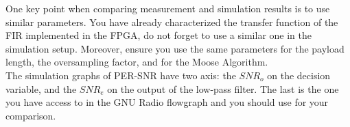 \begin{itemize}
\end{itemize}

One key point when comparing measurement and simulation results is to use similar parameters. You have already characterized the transfer function of the FIR implemented in the FPGA, do not forget to use a similar one in the simulation setup. Moreover, ensure you use the same parameters for the payload length, the oversampling factor, and for the Moose Algorithm. \\

The simulation graphs of PER-SNR have two axis: the $SNR_o$ on the decision variable, and the $SNR_e$ on the output of the low-pass filter. The last is the one you have access to in the GNU Radio flowgraph and you should use for your comparison.




